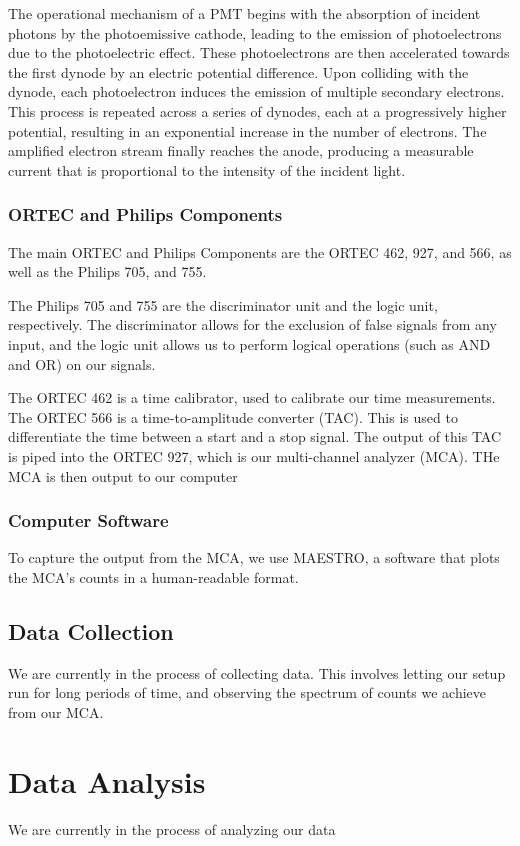 \documentclass[10pt,letterpaper,onecolumn]{article}
\begin{document}
The operational mechanism of a PMT begins with the absorption of incident photons by the photoemissive cathode, leading to the emission of photoelectrons due to the photoelectric effect. These photoelectrons are then accelerated towards the first dynode by an electric potential difference. Upon colliding with the dynode, each photoelectron induces the emission of multiple secondary electrons. This process is repeated across a series of dynodes, each at a progressively higher potential, resulting in an exponential increase in the number of electrons. The amplified electron stream finally reaches the anode, producing a measurable current that is proportional to the intensity of the incident light.
\subsubsection{ORTEC and Philips Components}
The main ORTEC and Philips Components are the ORTEC 462, 927, and 566, as well as the Philips 705, and 755.

The Philips 705 and 755 are the discriminator unit and the logic unit, respectively. The discriminator allows for the exclusion of false signals from any input, and the logic unit allows us to perform logical operations (such as AND and OR) on our signals.

The ORTEC 462 is a time calibrator, used to calibrate our time measurements. The ORTEC 566 is a time-to-amplitude converter (TAC). This is used to differentiate the time between a start and a stop signal. The output of this TAC is piped into the ORTEC 927, which is our multi-channel analyzer (MCA). THe MCA is then output to our computer
\subsubsection{Computer Software}
To capture the output from the MCA, we use MAESTRO, a software that plots the MCA's counts in a human-readable format. 
\subsection{Data Collection}
We are currently in the process of collecting data. This involves letting our setup run for long periods of time, and observing the spectrum of counts we achieve from our MCA.
\section{Data Analysis}
We are currently in the process of analyzing our data
\end{document}
